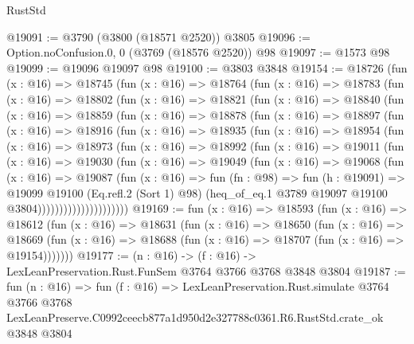 \begin{lexlean}{RustStd}
\begin{coremodule}
@19091 := @3790 (@3800 (@18571 @2520)) @3805
@19096 := Option.noConfusion.{0, 0} (@3769 (@18576 @2520)) @98
@19097 := @1573 @98
@19099 := @19096 @19097 @98
@19100 := @3803 @3848
@19154 := @18726
    (fun (x : @16) =>
    @18745
      (fun (x : @16) =>
      @18764
        (fun (x : @16) =>
        @18783
          (fun (x : @16) =>
          @18802
            (fun (x : @16) =>
            @18821
              (fun (x : @16) =>
              @18840
                (fun (x : @16) =>
                @18859
                  (fun (x : @16) =>
                  @18878
                    (fun (x : @16) =>
                    @18897
                      (fun (x : @16) =>
                      @18916
                        (fun (x : @16) =>
                        @18935
                          (fun (x : @16) =>
                          @18954
                            (fun (x : @16) =>
                            @18973
                              (fun (x : @16) =>
                              @18992
                                (fun (x : @16) =>
                                @19011
                                  (fun (x : @16) =>
                                  @19030
                                    (fun (x : @16) =>
                                    @19049
                                      (fun (x : @16) =>
                                      @19068
                                        (fun (x : @16) =>
                                        @19087
                                          (fun (x : @16) =>
                                          fun (fn : @98) =>
                                          fun (h : @19091) =>
                                          @19099
                                            @19100
                                            (Eq.refl.{2} (Sort 1) @98)
                                            (heq_of_eq.{1}
                                              @3789
                                              @19097
                                              @19100
                                              @3804)))))))))))))))))))))
@19169 := fun (x : @16) =>
  @18593
    (fun (x : @16) =>
    @18612
      (fun (x : @16) =>
      @18631
        (fun (x : @16) =>
        @18650
          (fun (x : @16) =>
          @18669 (fun (x : @16) => @18688 (fun (x : @16) => @18707 (fun (x : @16) => @19154)))))))
@19177 := (n : @16) -> (f : @16) -> LexLeanPreservation.Rust.FunSem @3764 @3766 @3768 @3848 @3804
@19187 := fun (n : @16) =>
  fun (f : @16) =>
  LexLeanPreservation.Rust.simulate
    @3764
    @3766
    @3768
    LexLeanPreserve.C0992ceecb877a1d950d2e327788c0361.R6.RustStd.crate_ok
    @3848
    @3804
\end{coremodule}
\end{lexlean}
